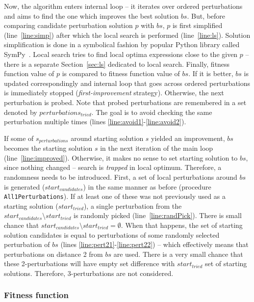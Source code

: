 \documentclass[a4paper,12pt]{elsarticle}
\begin{document}
Now, the algorithm enters internal loop -- it iterates over ordered perturbations and aims to find the one which improves the best solution $bs$. But, before comparing candidate perturbation solution $p$ with $bs$, $p$ is first simplified (line~\ref{line:simp}) after which the local search is performed (line~\ref{line:ls}).
Solution simplification is done in a symbolical fashion by popular Python library called SymPy~\cite{sympy}.
Local search tries to find local optima expressions close to the given $p$ -- there is a separate Section~\ref{sec:ls} dedicated to local search. 
Finally, fitness function value of $p$ is compared to fitness function value of $bs$. If it is better, $bs$ is updated correspondingly and internal loop that goes across ordered perturbations is immediately stopped (\emph{first-improvement} strategy). Otherwise, the next perturbation is probed. 
Note that probed perturbations are remembered in a set denoted by $perturbations_{tried}$. The goal is to avoid checking the same perturbation multiple times (lines \ref{line:avoid1}-\ref{line:avoid2}).


If some of $s_{perturbations}$ around starting solution $s$ yielded an improvement, $bs$ becomes the starting solution $s$ in the next iteration of the main loop (line~\ref{line:improved}). 
Otherwise, it makes no sense to set starting solution to $bs$, since nothing changed -- search is \emph{trapped} in local optimum. Therefore, a randomness needs to be introduced. First, a set of local perturbations around $bs$ is generated ($start_{candidates}$) in the same manner as before (procedure \texttt{All1Perturbations}). If at least one of these was not previously used as a starting solution ($start_{tried}$), a single perturbation from the $start_{candidates} \setminus start_{tried}$ is randomly picked (line~\ref{line:randPick}). There is small chance that $start_{candidates} \setminus start_{tried} = \emptyset$. When that happens, the set of starting solution candidates is equal to perturbations of some randomly selected perturbation of $bs$ (lines \ref{line:pert21}-\ref{line:pert22}) -- which effectively means that perturbations on distance 2 from $bs$ are used. There is a very small chance that these 2-perturbations will have empty set difference with $start_{tried}$ set of starting solutions. Therefore, 3-perturbations are not considered. 

\subsubsection{Fitness function}\label{sec:fitness}
\end{document}
